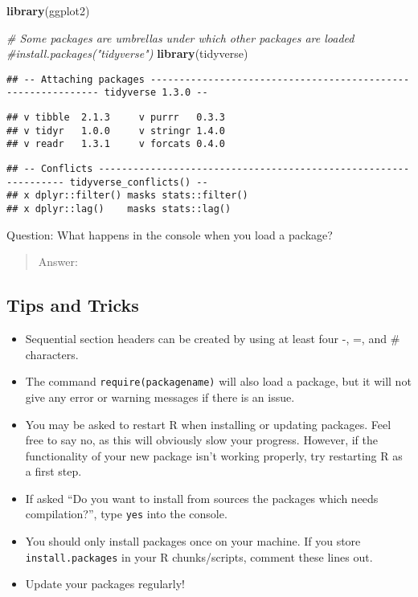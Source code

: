 \documentclass[]{article}
\newenvironment{Shaded}{\begin{snugshade}}{\end{snugshade}}
\newcommand{\CommentTok}[1]{\textcolor[rgb]{0.56,0.35,0.01}{\textit{#1}}}
\newcommand{\KeywordTok}[1]{\textcolor[rgb]{0.13,0.29,0.53}{\textbf{#1}}}
\newcommand{\NormalTok}[1]{#1}
\begin{document}
\begin{Shaded}
\begin{Highlighting}[]
\KeywordTok{library}\NormalTok{(ggplot2)}

\CommentTok{# Some packages are umbrellas under which other packages are loaded}
\CommentTok{#install.packages("tidyverse")}
\KeywordTok{library}\NormalTok{(tidyverse)}
\end{Highlighting}
\end{Shaded}

\begin{verbatim}
## -- Attaching packages ------------------------------------------------------------- tidyverse 1.3.0 --
\end{verbatim}

\begin{verbatim}
## v tibble  2.1.3     v purrr   0.3.3
## v tidyr   1.0.0     v stringr 1.4.0
## v readr   1.3.1     v forcats 0.4.0
\end{verbatim}

\begin{verbatim}
## -- Conflicts ---------------------------------------------------------------- tidyverse_conflicts() --
## x dplyr::filter() masks stats::filter()
## x dplyr::lag()    masks stats::lag()
\end{verbatim}

Question: What happens in the console when you load a package?

\begin{quote}
Answer:
\end{quote}

\hypertarget{tips-and-tricks}{%
\subsection{Tips and Tricks}\label{tips-and-tricks}}

\begin{itemize}
\item
  Sequential section headers can be created by using at least four -, =,
  and \# characters.
\item
  The command \texttt{require(packagename)} will also load a package,
  but it will not give any error or warning messages if there is an
  issue.
\item
  You may be asked to restart R when installing or updating packages.
  Feel free to say no, as this will obviously slow your progress.
  However, if the functionality of your new package isn't working
  properly, try restarting R as a first step.
\item
  If asked ``Do you want to install from sources the packages which
  needs compilation?'', type \texttt{yes} into the console.
\item
  You should only install packages once on your machine. If you store
  \texttt{install.packages} in your R chunks/scripts, comment these
  lines out.
\item
  Update your packages regularly!
\end{itemize}
\end{document}
